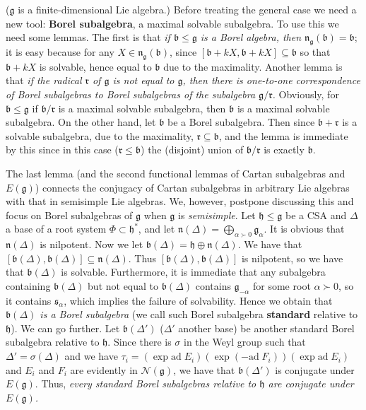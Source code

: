 \documentclass{article}
\newcommand{\lie}[1]{\mathfrak{#1}}
\newcommand{\ad}[1]{\mathrm{ad}\; #1}
\begin{document}
($\lie{g}$ is a finite-dimensional Lie algebra.)
Before treating the general case we need a new tool: \textbf{Borel subalgebra}, a maximal solvable subalgebra.
To use this we need some lemmas.
The first is that \textit{if $\lie{b} \le \lie{g}$ is a Borel algebra, then $\lie{n}_\lie{g}(\lie{b}) = \lie{b}$}; it is easy because for any $X \in \lie{n}_\lie{g}(\lie{b})$, since $[\lie{b} + kX, \lie{b} + kX] \subseteq \lie{b}$ so that $\lie{b} + kX$ is solvable, hence equal to $\lie{b}$ due to the maximality.
Another lemma is that \textit{if the radical $\lie{r}$ of $\lie{g}$ is not equal to $\lie{g}$, then there is one-to-one correspondence of Borel subalgebras to Borel subalgebras of the subalgebra $\lie{g}/\lie{r}$.}
Obviously, for $\lie{b} \le \lie{g}$ if $\lie{b}/\lie{r}$ is a maximal solvable subalgebra, then $\lie{b}$ is a maximal solvable subalgebra.
On the other hand, let $\lie{b}$ be a Borel subalgebra.
Then since $\lie{b} + \lie{r}$ is a solvable subalgebra, due to the maximality, $\lie{r} \subseteq \lie{b}$, and the lemma is immediate by this since in this case ($\lie{r} \le \lie{b}$) the (disjoint) union of $\lie{b}/\lie{r}$ is exactly $\lie{b}$.

The last lemma (and the second functional lemmas of Cartan subalgebras and $E(\lie{g})$) connects the conjugacy of Cartan subalgebras in arbitrary Lie algebras with that in semisimple Lie algebras.
We, however, postpone discussing this and focus on Borel subalgebras of $\lie{g}$ when $\lie{g}$ is \textit{semisimple}.
Let $\lie{h} \le \lie{g}$ be a CSA and $\Delta$ a base of a root system $\Phi \subset \lie{h}^*$, and let $\lie{n}(\Delta) = \bigoplus_{\alpha \succ 0} \lie{g}_\alpha$.
It is obvious that $\lie{n}(\Delta)$ is nilpotent.
Now we let $\lie{b}(\Delta) = \lie{h} \oplus \lie{n}(\Delta)$.
We have that $[\lie{b}(\Delta), \lie{b}(\Delta)] \subseteq \lie{n}(\Delta)$.
Thus $[\lie{b}(\Delta), \lie{b}(\Delta)]$ is nilpotent, so we have that $\lie{b}(\Delta)$ is solvable.
Furthermore, it is immediate that any subalgebra containing $\lie{b}(\Delta)$ but not equal to $\lie{b}(\Delta)$ contains $\lie{g}_{-\alpha}$ for some root $\alpha \succ 0$, so it contains $\lie{s}_\alpha$, which implies the failure of solvability.
Hence we obtain that \textit{$\lie{b}(\Delta)$ is a Borel subalgebra} (we call such Borel subalgebra \textbf{standard} relative to $\lie{h}$).
We can go further.
Let $\lie{b}(\Delta')$ ($\Delta'$ another base) be another standard Borel subalgebra relative to $\lie{h}$.
Since there is $\sigma$ in the Weyl group such that $\Delta' = \sigma(\Delta)$ and we have $\tau_i = (\exp{\ad{E_i}}) (\exp{(-\ad{F_i})}) (\exp{\ad{E_i}})$ and $E_i$ and $F_i$ are evidently in $\mathcal{N}(\lie{g})$, we have that $\lie{b}(\Delta')$ is conjugate under $E(\lie{g})$.
Thus, \textit{every standard Borel subalgebras relative to $\lie{h}$ are conjugate under $E(\lie{g})$.}
\end{document}
